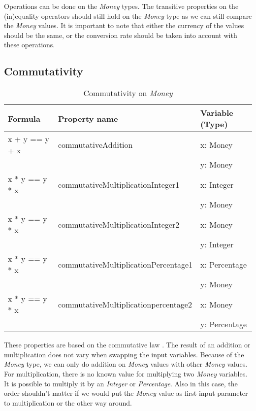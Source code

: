 Operations can be done on the \textit{Money} types. The transitive properties \cite{raftery2011perspective} on the (in)equality operators should still hold on the \textit{Money} type as we can still compare the \textit{Money} values. It is important to note that either the currency of the values should be the same, or the conversion rate should be taken into account with these operations. 

\subsection{Commutativity}
\label{ssct:4_commutativity}
\begin{table}[h!]
\centering
\begin{tabular}{|lll|}
\hline
                        \textbf{Formula} & \textbf{Property name}               & \textbf{Variable (Type)} \\ \hline
\rowcolor[HTML]{EFEFEF} x + y == y + x   & commutativeAddition                  & x: Money                 \\
\rowcolor[HTML]{EFEFEF}                  &                                      & y: Money                 \\
                        x * y == y * x   & commutativeMultiplicationInteger1    & x: Integer               \\
                                         &                                      & y: Money                 \\
\rowcolor[HTML]{EFEFEF} x * y == y * x   & commutativeMultiplicationInteger2    & x: Money                 \\
\rowcolor[HTML]{EFEFEF}                  &                                      & y: Integer               \\
                        x * y == y * x   & commutativeMultiplicationPercentage1 & x: Percentage            \\
                                         &                                      & y: Money                 \\
\rowcolor[HTML]{EFEFEF} x * y == y * x   & commutativeMultiplicationpercentage2 & x: Money                 \\
\rowcolor[HTML]{EFEFEF}                  &                                      & y: Percentage            \\ \hline
\end{tabular}
\caption{Commutativity on \textit{Money}}
\label{tbl:ch4_money_commutativity}
\end{table}
These properties are based on the commutative law \cite{baumgart1961axioms}. The result of an addition or multiplication does not vary when swapping the input variables. Because of the \textit{Money} type, we can only do addition on \textit{Money} values with other \textit{Money} values. For multiplication, there is no known value for multiplying two \textit{Money} variables. It is possible to multiply it by an \textit{Integer} or \textit{Percentage}. Also in this case, the order shouldn't matter if we would put the \textit{Money} value as first input parameter to multiplication or the other way around.

